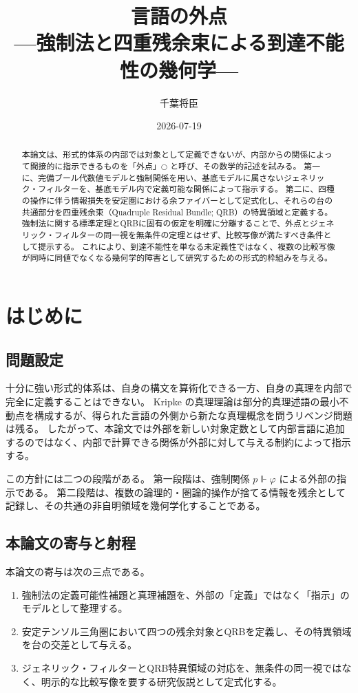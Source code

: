\documentclass[11pt]{ltjsarticle}
\title{言語の外点\\
---強制法と四重残余束による到達不能性の幾何学---}
\author{千葉将臣}
\date{2026-07-19}
\theoremstyle{plain}
\theoremstyle{definition}
\begin{document}
\maketitle

\begin{abstract}
本論文は、形式的体系の内部では対象として定義できないが、内部からの関係によって間接的に指示できるものを「外点」\(\bigcirc\) と呼び、その数学的記述を試みる。
第一に、完備ブール代数値モデルと強制関係を用い、基底モデルに属さないジェネリック・フィルターを、基底モデル内で定義可能な関係によって指示する。
第二に、四種の操作に伴う情報損失を安定圏における余ファイバーとして定式化し、それらの台の共通部分を四重残余束（Quadruple Residual Bundle; QRB）の特異領域と定義する。
強制法に関する標準定理とQRBに固有の仮定を明確に分離することで、外点とジェネリック・フィルターの同一視を無条件の定理とはせず、比較写像が満たすべき条件として提示する。
これにより、到達不能性を単なる未定義性ではなく、複数の比較写像が同時に同値でなくなる幾何学的障害として研究するための形式的枠組みを与える。
\end{abstract}

\section{はじめに}

\subsection{問題設定}

十分に強い形式的体系は、自身の構文を算術化できる一方、自身の真理を内部で完全に定義することはできない\cite{godel1931,tarski1936}。
Kripke の真理理論は部分的真理述語の最小不動点を構成するが、得られた言語の外側から新たな真理概念を問うリベンジ問題は残る\cite{kripke1975}。
したがって、本論文では外部を新しい対象定数として内部言語に追加するのではなく、内部で計算できる関係が外部に対して与える制約によって指示する。

この方針には二つの段階がある。
第一段階は、強制関係 \(p\Vdash\varphi\) による外部の指示である。
第二段階は、複数の論理的・圏論的操作が捨てる情報を残余として記録し、その共通の非自明領域を幾何学化することである。

\subsection{本論文の寄与と射程}

本論文の寄与は次の三点である。
\begin{enumerate}
\item 強制法の定義可能性補題と真理補題を、外部の「定義」ではなく「指示」のモデルとして整理する。
\item 安定テンソル三角圏において四つの残余対象とQRBを定義し、その特異領域を台の交差として与える。
\item ジェネリック・フィルターとQRB特異領域の対応を、無条件の同一視ではなく、明示的な比較写像を要する研究仮説として定式化する。
\end{enumerate}
\end{document}
